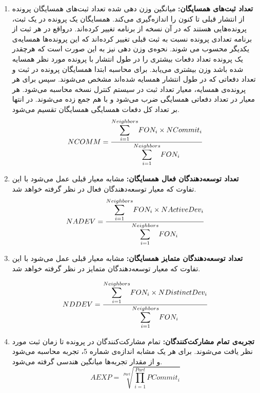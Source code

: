 \begin{enumerate}
	\item
	\textbf{تعداد ثبت‌های همسایگان:}
	میانگین وزن دهی شده تعداد ثبت‌های همسایگان پرونده از انتشار قبلی تا کنون را اندازه‌گیری می‌کند. همسایگان یک پرونده در یک ثبت، پرونده‌هایی هستند که در آن نسخه از برنامه تغییر کرده‌اند. در‌واقع در هر ثبت از برنامه تعدادی پرونده نسبت به ثبت قبلی تغییر کرده‌اند که این پرونده‌ها همسایه‌ی یکدیگر محسوب می شوند. نحوه‌ی وزن دهی نیز به این صورت است که هرچقدر یک پرونده تعداد دفعات بیشتری را در طول انتشار با پرونده مورد نظر همسایه شده باشد وزن بیشتری می‌یابد. برای محاسبه ابتدا همسایگان پرونده در ثبت  و تعداد دفعاتی که  در طول انتشار همسایه شده‌اند مشخص می‌شوند. سپس برای هر پرونده‌ی همسایه، معیار تعداد ثبت در سیستم کنترل نسخه محاسبه می‌شود. هر معیار در تعداد دفعاتی همسایگی ضرب می‌شود و با هم جمع زده می‌شوند. در انتها بر تعداد کل دفعات همسایگی همسایگان تقسیم می‌شود. 
\begin{equation} \label{eq:ncomm}
NCOMM = \frac{\mathlarger{\sum}\limits_{i=1}^{Neighbors} FON_i \times NCommit_i}{\mathlarger{\sum}\limits_{i=1}^{Neighbors}FON_i}
\end{equation}
	\item
	\textbf{تعداد توسعه‌دهندگان فعال همسایگان:}
	مشابه معیار قبلی عمل می‌شود با این تفاوت که معیار توسعه‌دهندگان فعال در نظر گرفته خواهد شد.
\begin{equation}\label{eq:nadev}
	NADEV = \frac{\mathlarger{\sum}\limits_{i=1}^{Neighbors} FON_i \times NActiveDev_i}{\mathlarger{\sum}\limits_{i=1}^{Neighbors}FON_i}
\end{equation}
	\item
	\textbf{تعداد توسعه‌دهندگان متمایز همسایگان:}
	مشابه معیار قبلی عمل می‌شود با این تفاوت که معیار توسعه‌دهندگان متمایز در نظر گرفته خواهد شد.

\begin{equation} \label{eq:nddev}
NDDEV = \frac{\mathlarger{\sum}\limits_{i=1}^{Neighbors} FON_i \times NDistinctDev_i}{\mathlarger{\sum}\limits_{i=1}^{Neighbors}FON_i}
\end{equation}

	\item
	\textbf{تجربه‌ی تمام مشارکت‌کنندگان:}
	تمام مشارکت‌کنندگان در پرونده تا زمان ثبت مورد نظر یافت می‌شوند. برای هر یک مشابه  اندازه‌ی شماره 5، تجربه محاسبه می‌شود و از مقدار تجربه‌ها میانگین هندسی گرفته می‌شود. 
\begin{equation}\label{eq:aexp}
AEXP = \sqrt[Part]{ \prod\limits_{i=1}^{Part}PCommit_i}
\end{equation}	
	
\end{enumerate}
 
